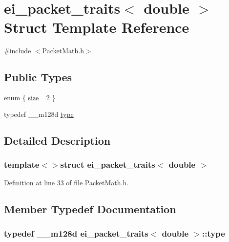 \hypertarget{structei__packet__traits_3_01double_01_4}{\section{ei\-\_\-packet\-\_\-traits$<$ double $>$ Struct Template Reference}
\label{structei__packet__traits_3_01double_01_4}
}


{\ttfamily \#include $<$Packet\-Math.\-h$>$}

\subsection*{Public Types}
\begin{DoxyCompactItemize}
\item 
enum \{ \hyperlink{structei__packet__traits_3_01double_01_4_ab0ca2d4fab56f6c285a8488ea736c7dea6a6de0554c28903bf1d10faa9ccbe244}{size} =2
 \}
\item 
typedef \-\_\-\-\_\-m128d \hyperlink{structei__packet__traits_3_01double_01_4_aeb73ab942298e866579a859da0043a93}{type}
\end{DoxyCompactItemize}


\subsection{Detailed Description}
\subsubsection*{template$<$$>$struct ei\-\_\-packet\-\_\-traits$<$ double $>$}



Definition at line 33 of file Packet\-Math.\-h.



\subsection{Member Typedef Documentation}
\hypertarget{structei__packet__traits_3_01double_01_4_aeb73ab942298e866579a859da0043a93}{
\subsubsection[{type}]{\setlength{\rightskip}{0pt plus 5cm}typedef \-\_\-\-\_\-m128d {\bf ei\-\_\-packet\-\_\-traits}$<$ {\bf double} $>$\-::{\bf type}}}\label{structei__packet__traits_3_01double_01_4_aeb73ab942298e866579a859da0043a93}


